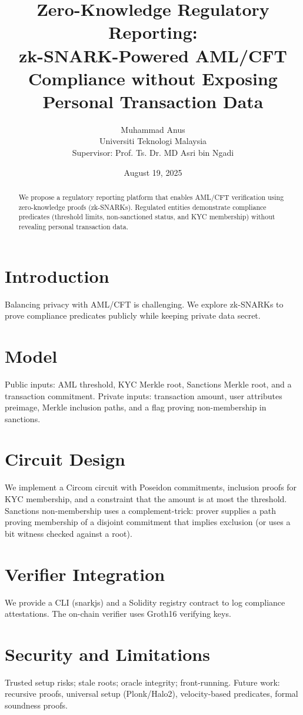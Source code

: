 \documentclass[11pt]{article}
\title{Zero-Knowledge Regulatory Reporting:\\ zk-SNARK-Powered AML/CFT Compliance without Exposing Personal Transaction Data}
\author{Muhammad Anus \\ Universiti Teknologi Malaysia \\ Supervisor: Prof. Ts. Dr. MD Asri bin Ngadi}
\date{August 19, 2025}
\begin{document}
\maketitle

\begin{abstract}
We propose a regulatory reporting platform that enables AML/CFT verification using zero-knowledge proofs (zk-SNARKs). Regulated entities demonstrate compliance predicates (threshold limits, non-sanctioned status, and KYC membership) without revealing personal transaction data.
\end{abstract}

\section{Introduction}
Balancing privacy with AML/CFT is challenging. We explore zk-SNARKs to prove compliance predicates publicly while keeping private data secret.

\section{Model}
Public inputs: AML threshold, KYC Merkle root, Sanctions Merkle root, and a transaction commitment.
Private inputs: transaction amount, user attributes preimage, Merkle inclusion paths, and a flag proving non-membership in sanctions.

\section{Circuit Design}
We implement a Circom circuit with Poseidon commitments, inclusion proofs for KYC membership, and a constraint that the amount is at most the threshold. Sanctions non-membership uses a complement-trick: prover supplies a path proving membership of a disjoint commitment that implies exclusion (or uses a bit witness checked against a root).

\section{Verifier Integration}
We provide a CLI (snarkjs) and a Solidity registry contract to log compliance attestations. The on-chain verifier uses Groth16 verifying keys.

\section{Security and Limitations}
Trusted setup risks; stale roots; oracle integrity; front-running. Future work: recursive proofs, universal setup (Plonk/Halo2), velocity-based predicates, formal soundness proofs.
\end{document}
